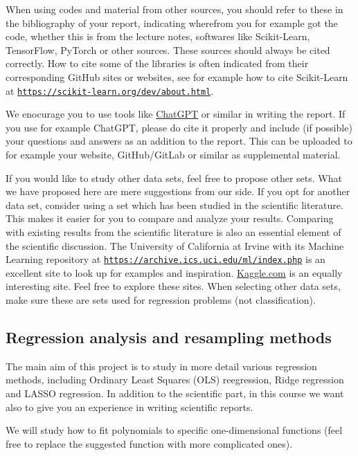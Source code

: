 \documentclass[%
oneside,                 %
final,                   %
10pt]{article}
\begin{document}
When using codes and material from other sources, you should refer to
these in the bibliography of your report, indicating wherefrom you for
example got the code, whether this is from the lecture notes,
softwares like Scikit-Learn, TensorFlow, PyTorch or other sources. These sources
should always be cited correctly. How to cite some
of the libraries is often indicated from their corresponding GitHub
sites or websites, see for example how to cite Scikit-Learn at
\href{{https://scikit-learn.org/dev/about.html}}{\nolinkurl{https://scikit-learn.org/dev/about.html}}.

We enocurage you to use tools like
\href{{https://openai.com/chatgpt/}}{ChatGPT} or similar in writing the report. If you use for example ChatGPT,
please do cite it properly and include (if possible) your questions and answers as an addition to the report. This can
be uploaded to for example your website, GitHub/GitLab or similar as supplemental material.

If you would like to study other data sets, feel free to propose other
sets. What we have proposed here are mere suggestions from our
side. If you opt for another data set, consider using a set which has
been studied in the scientific literature. This makes it easier for
you to compare and analyze your results. Comparing with existing
results from the scientific literature is also an essential element of
the scientific discussion.  The University of California at Irvine
with its Machine Learning repository at
\href{{https://archive.ics.uci.edu/ml/index.php}}{\nolinkurl{https://archive.ics.uci.edu/ml/index.php}} is an excellent site to
look up for examples and
inspiration. \href{{https://www.kaggle.com/}}{Kaggle.com} is an equally
interesting site. Feel free to explore these sites. When selecting
other data sets, make sure these are sets used for regression problems
(not classification).

\subsection*{Regression analysis and resampling methods}

The main aim of this project is to study in more detail various
regression methods, including Ordinary Least Squares (OLS) reegression, Ridge regression and LASSO regression.
In addition to the scientific part, in this course we want also to
give you an experience in writing scientific reports.

We will study how to fit polynomials to specific
one-dimensional functions (feel free to replace the suggested function with more complicated ones).
\end{document}
